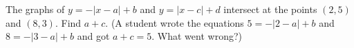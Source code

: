 The graphs of $y=-|x-a|+b$ and $y=|x-c|+d$ intersect at the points $(2,5)$ and $(8,3)$. Find $a+c$. (A student wrote the equations $5=-|2-a|+b$ and $8=-|3-a|+b$ and got $a+c=5$. What went wrong?)
